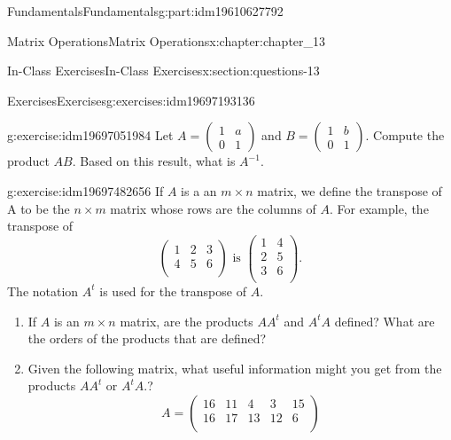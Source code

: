 \documentclass[oneside,10pt,]{book}
\numberwithin{equation}{section}
\begin{document}
\begin{partptx}{Fundamentals}{}{Fundamentals}{}{}{g:part:idm19610627792}
\begin{chapterptx}{Matrix Operations}{}{Matrix Operations}{}{}{x:chapter:chapter_13}
\begin{sectionptx}{In-Class Exercises}{}{In-Class Exercises}{}{}{x:section:questions-13}
\begin{exercises-subsection-numberless}{Exercises}{}{Exercises}{}{}{g:exercises:idm19697193136}
\begin{exercisegroup}
\begin{divisionexerciseeg}{1}{}{}{g:exercise:idm19697051984}
Let \(A=\left(\begin{array}{cc} 1 & a\\ 0 & 1 \end{array}\right)\) and \(B=\left(\begin{array}{cc} 1 & b\\ 0 & 1 \end{array}\right)\).  Compute the product \(A B\).  Based on this result, what is \(A^{-1}\).%
\end{divisionexerciseeg}%
\begin{divisionexerciseeg}{2}{}{}{g:exercise:idm19697482656}%
%
If \(A\) is a an \(m \times n\) matrix, we define the transpose of A to be the \(n \times m\) matrix whose rows are the columns of \(A\).  For example, the transpose of%
\begin{equation*}
\left(
\begin{array}{ccc}
1 &2 &3 \\
4 &5 &6 \\
\end{array}
\right) \textrm{  is  }
\left(
\begin{array}{cc}
1 &4 \\
2 &5 \\
3 &6 \\
\end{array}
\right).
\end{equation*}
The notation \(A^t\) is used for the transpose of \(A\).%
\begin{enumerate}[label=(\alph*)]
\item{}If \(A\) is an \(m \times n\) matrix, are the products \(A A^t\) and \(A^t A \) defined?  What are the orders of the products that are defined?%
\item{}Given the following matrix, what useful information might you get from the products \(A A^t\) or \(A^t A\).?%
\begin{equation*}
A=\left(
\begin{array}{ccccc}
16 &11 &4 &3 &15 \\
16 &17 &13 &12 &6 \\
\end{array}
\right) 
\end{equation*}
%
\end{enumerate}
%
\end{divisionexerciseeg}%
\end{exercisegroup}
\end{exercises-subsection-numberless}
\end{sectionptx}
\end{chapterptx}
\end{partptx}
\end{document}

